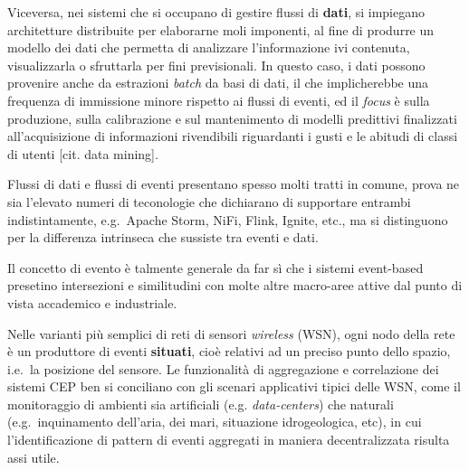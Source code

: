 Viceversa, nei sistemi che si occupano di gestire flussi di
\textbf{dati}, si impiegano architetture distribuite per elaborarne moli
imponenti, al fine di produrre un modello dei dati che permetta di
analizzare l'informazione ivi contenuta, visualizzarla o sfruttarla per
fini previsionali. In questo caso, i dati possono provenire anche da
estrazioni \emph{batch} da basi di dati, il che implicherebbe una
frequenza di immissione minore rispetto ai flussi di eventi, ed il
\emph{focus} è sulla produzione, sulla calibrazione e sul mantenimento
di modelli predittivi finalizzati all'acquisizione di informazioni
rivendibili riguardanti i gusti e le abitudi di classi di utenti {[}cit.
data mining{]}.

Flussi di dati e flussi di eventi presentano spesso molti tratti in
comune, prova ne sia l'elevato numeri di teconologie che dichiarano di
supportare entrambi indistintamente, e.g.~Apache Storm, NiFi, Flink,
Ignite, etc., ma si distinguono per la differenza intrinseca che
sussiste tra eventi e dati.

Il concetto di evento è talmente generale da far sì che i sistemi
event-based presetino intersezioni e similitudini con molte altre
macro-aree attive dal punto di vista accademico e industriale.

Nelle varianti più semplici di reti di sensori \emph{wireless} (WSN),
ogni nodo della rete è un produttore di eventi \textbf{situati}, cioè
relativi ad un preciso punto dello spazio, i.e.~la posizione del
sensore. Le funzionalità di aggregazione e correlazione dei sistemi CEP
ben si conciliano con gli scenari applicativi tipici delle WSN, come il
monitoraggio di ambienti sia artificiali (e.g. \emph{data-centers}) che
naturali (e.g.~inquinamento dell'aria, dei mari, situazione
idrogeologica, etc), in cui l'identificazione di pattern di eventi
aggregati in maniera decentralizzata risulta assi utile.

